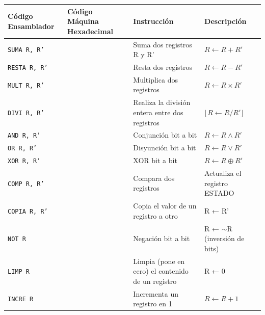 \documentclass{article}
\begin{document}
\begin{longtable}{|p{}|p{}|p{}|p{}|}
  \hline
  \textbf{Código Ensamblador} & \textbf{Código Máquina Hexadecimal} & \textbf{Instrucción}                                               & \textbf{Descripción}                       \\
  \hline
  \texttt{SUMA R, R'}  &     & Suma dos registros R y R'                                          & $R \leftarrow  R + R'$                     \\
  \hline
  \texttt{RESTA R, R'} &     & Resta dos registros                                                & $R \leftarrow R - R'$                      \\
  \hline
  \texttt{MULT R, R'}  &     & Multiplica dos registros                                           & $R \leftarrow R \times R'$                 \\
  \hline
  \texttt{DIVI R, R'}  &     & Realiza la división entera entre dos registros                     & $\lfloor R \leftarrow R / R' \rfloor$      \\
  \hline
  \texttt{AND R, R'}   &     & Conjunción bit a bit                                               & $R \leftarrow R \wedge R'$                 \\
  \hline
  \texttt{OR R, R'}    &     & Disyunción bit a bit                                               & $R \leftarrow R \vee R'$                   \\
  \hline
  \texttt{XOR R, R'}   &     & XOR bit a bit                                                      & $R \leftarrow R \oplus R'$                 \\
  \hline
  \texttt{COMP R, R'}  &     & Compara dos registros                                              & Actualiza el registro ESTADO \\
  \hline
  \texttt{COPIA R, R'} &     & Copia el valor de un registro a otro                               & R ← R'                                     \\
  \hline
  \texttt{NOT R}       &     & Negación bit a bit                                                 & R ← $\sim$R (inversión de bits)            \\
  \hline
  \texttt{LIMP R}    &     & Limpia (pone en cero) el contenido de un registro & R ← 0                                      \\
  \hline
  \texttt{INCRE R}     &     & Incrementa un registro en 1                                        & $R \leftarrow R + 1$                       \\

\end{longtable}
\end{document}
